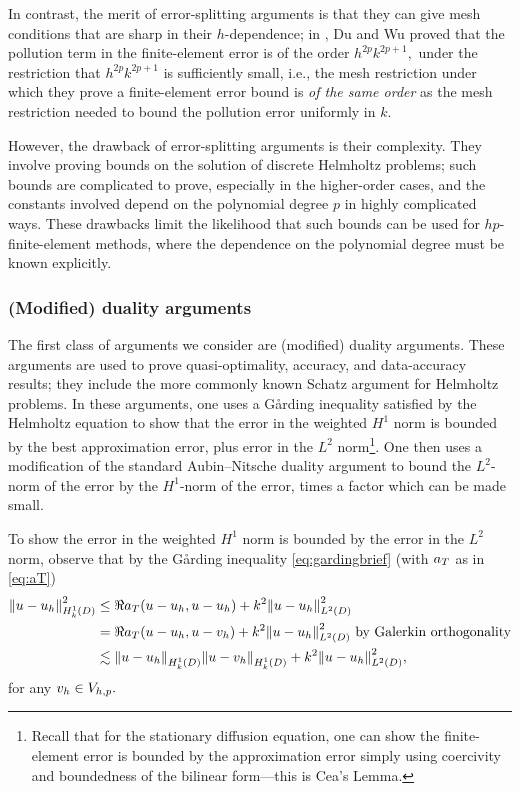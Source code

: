 In contrast, the merit of error-splitting arguments is that they can give mesh conditions that are sharp in their $h$-dependence; in \cite{DuWu:15}, Du and Wu proved that the pollution term in the finite-element error is of the order $h^{2p}k^{2p+1},$ under the restriction that $h^{2p}k^{2p+1}$ is sufficiently small, i.e., the mesh restriction under which they prove a finite-element error bound is \emph{of the same order} as the mesh restriction needed to bound the pollution error uniformly in $k.$

However, the drawback of error-splitting arguments is their complexity. They involve proving bounds on the solution of discrete Helmholtz problems; such bounds are complicated to prove, especially in the higher-order cases, and the constants involved depend on the polynomial degree $p$ in highly complicated ways. These drawbacks limit the likelihood that such bounds can be used for $hp$-finite-element methods, where the dependence on the polynomial degree must be known explicitly.


\subsubsection{(Modified) duality arguments}
The first class of arguments we consider are (modified) duality arguments. These arguments are used to prove quasi-optimality, accuracy, and data-accuracy results; they include the more commonly known Schatz argument for Helmholtz problems. In these arguments, one uses a G\r{a}rding inequality satisfied by the Helmholtz equation to show that the error in the weighted $H^1$ norm is bounded by the best approximation error, plus error in the $L^2$ norm\footnote{Recall that for the stationary diffusion equation, one can show the finite-element error is bounded by the approximation error simply using coercivity and boundedness of the bilinear form---this is Cea's Lemma.}. One then uses a modification of the standard Aubin--Nitsche duality argument to bound the $L^2$-norm of the error by the $H^1$-norm of the error, times a factor which can be made small.

To show the error in the weighted $H^1$ norm is bounded by the error in the $L^2$ norm, observe that by the G\r{a}rding inequality \cref{eq:gardingbrief} (with $a_{T}$ as in \cref{eq:aT})
\begin{align}
\NHokD{u-\uh}^2 &\leq \Re{\aT(u-\uh,u-\uh)} + k^2 \NLtD{u-\uh}^2\nonumber\\
&= \Re{\aT(u-\uh,u-\vh)} + k^2 \NLtD{u-\uh}^2\text{ by Galerkin orthogonality}\nonumber\\
&\lesssim \NHokD{u-\uh}\NHokD{u-\vh} + k^2 \NLtD{u-\uh}^2,\label{eq:gardingerror}
\end{align}
for any $v_{h} \in V_{h,p}.$

